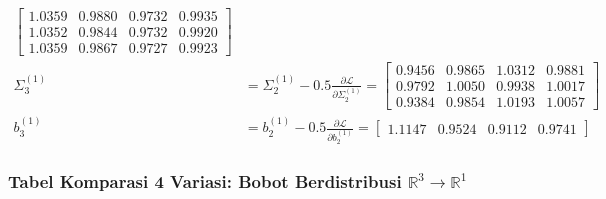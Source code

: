 \documentclass[11pt,a4paper]{article}
\def\mathbf#1{#1}%
\theoremstyle{plain}
\theoremstyle{definition}
\theoremstyle{remark}
\begin{document}
\begin{enumerate}
\begin{align}
\begin{bmatrix}
            1.0359 & 0.9880 & 0.9732 & 0.9935 \\
            1.0352 & 0.9844 & 0.9732 & 0.9920 \\
            1.0359 & 0.9867 & 0.9727 & 0.9923
        \end{bmatrix} \\[0.2em]
        \Sigma^{(1)}_3 &= \Sigma^{(1)}_2 - 0.5 \frac{\partial \mathcal{L}}{\partial \Sigma^{(1)}_2} = \begin{bmatrix}
            0.9456 & 0.9865 & 1.0312 & 0.9881 \\
            0.9792 & 1.0050 & 0.9938 & 1.0017 \\
            0.9384 & 0.9854 & 1.0193 & 1.0057
        \end{bmatrix} \\[0.2em]
        \mathbf{b}^{(1)}_3 &= \mathbf{b}^{(1)}_2 - 0.5 \frac{\partial \mathcal{L}}{\partial \mathbf{b}^{(1)}_2} = \begin{bmatrix} 1.1147 & 0.9524 & 0.9112 & 0.9741 \end{bmatrix}
    \end{align}
\end{enumerate}

\clearpage
\subsubsection{Tabel Komparasi 4 Variasi: Bobot Berdistribusi \texorpdfstring{$\mathbb{R}^3 \to \mathbb{R}^1$}{R3 -> R1}}
\label{subsubsec:tabel_distribusi_r1}
\end{document}
